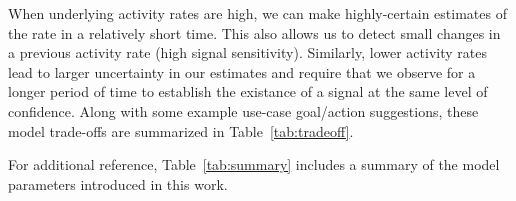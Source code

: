 \documentclass{article}
\begin{document}
When 
\reversemarginpar\marginpar{\raggedleft
%
    \begin{tikzpicture}[scale=0.26]]
\draw [red, very thick, rotate around={0: (0, 0)}] (-0.7, -0.7) rectangle(3.7, 3.298076211353316);
%
\draw [very thick, <->] (0.25000000000000006, 0.4330127018922193) -- (1.25, 2.165063509461097) ;
\draw [very thick, <->] (1.75, 2.165063509461097) -- (2.75, 0.4330127018922193) ;
\draw [very thick, <->] (2.5, 0) -- (0.5, 0) ;
%
\draw [orange, ultra thick] (0,0) circle [radius= 0.5 ];
\draw [yellow, ultra thick] ( 1.5 , 2.59807621135 ) circle [radius= 0.5 ];
\draw [green,  ultra thick] ( 3.0 , 0 ) circle [radius= 0.5 ];
    \end{tikzpicture}
%
%
}
underlying activity rates are high, we can make highly-certain estimates of the rate in a relatively 
short time. This also allows us to detect small changes in a previous activity rate (high signal 
sensitivity). Similarly, lower activity rates lead to larger uncertainty in our estimates and require that 
we observe for a longer period of time to establish the existance of a signal at the same 
level of confidence. Along with some example use-case goal/action suggestions, these model 
trade-offs are summarized in Table~\ref{tab:tradeoff}.

For additional reference, Table~\ref{tab:summary} includes a summary of the model parameters 
introduced in this work.
\end{document}
